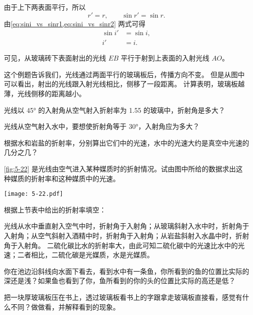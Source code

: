 由于上下两表面平行，所以
\[r'=r,\qquad \sin r'=\sin r. \]
由\cref{eq:sini_vs_sinr1,eq:sini_vs_sinr2} 两式可得
\[\begin{split}
    \sin i'&=\sin i,\\
i'&=i.    
\end{split}\]

可见，从玻璃砖下表面射出的光线 $EB$ 平行于射到上表面的入射光线 $AO$。

这个例题告诉我们，光线通过两面平行的玻璃板后，传播方向不变。
但是从图中可以看出，射出的光线跟入射光线相比，侧移了一段距离。
计算表明，玻璃板越薄，光线侧移的距离越小。

\begin{Practice}
\begin{question}
  \item 光线以 \ang{45} 的入射角从空气射入折射率为 1.55 的玻璃中，折射角是多大？
  \item 光线从空气射入水中，要想使折射角等于 \ang{30}，入射角应为多大？
  \item 根据水和岩盐的折射率，分别算出它们中的光速，水中的光速大约是真空中光速的几分之几？
  \item \cref{fig:5-22} 是光线由空气进入某种媒质时的折射情况。试由图中所给的数据求出这种媒质的折射率和这种媒质中的光速。
  \begin{figurehere}
    \begin{minipage}{\linewidth}\centering
      \texttt{[image: 5-22.pdf]}
      \caption{}\label{fig:5-22}
    \end{minipage}
  \end{figurehere}
  \item 根据上节表中给出的折射率填空：
  \begin{tasks}
    \task 光线从水中垂直射入空气中时，折射角\underline{\qquad}于入射角；从玻璃斜射入水中时，折射角\underline{\qquad}于入射角；从空气斜射入酒精中时，折射角\underline{\qquad}于入射角；从岩盐斜射入水晶中时，折射角\underline{\qquad}于入射角。
    \task 二硫化碳比水的折射率大，由此可知二硫化碳中的光速比水中的光速\underline{\qquad}；二者相比，二硫化碳是光\underline{\qquad}媒质，水是光\underline{\qquad}媒质。
  \end{tasks}
  \item 你在池边沿斜线向水面下看去，看到水中有一条鱼，你所看到的鱼的位置比实际的深还是浅？如果鱼也看到了你，鱼所看到的你的头的位置比实际的高还是低？
  \item 把一块厚玻璃板压在书上，透过玻璃板看书上的字跟拿走玻璃板直接看，感觉有什么不同？做做看，并解释看到的现象。
\end{question}
\end{Practice}

